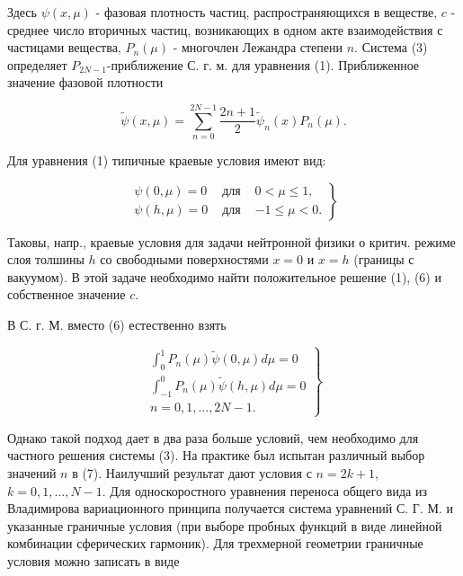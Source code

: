 \documentclass[10pt]{article}
\begin{document}
Здесь $\psi(x, \mu)$ - фазовая плотность частиц, распространяющихся в веществе, $c$ - среднее число вторичных частиц, возникающих в одном акте взаимодействия с частицами вещества, $P_{n}(\mu)$ - многочлен Лежандра степени $n$. Система (3) определяет $P_{2 N-1}$-приближение С. г. м. для уравнения (1). Приближенное значение фазовой плотности



\[

\tilde{\psi}(x, \mu)=\sum_{n=0}^{2 N-1} \frac{2 n+1}{2} \tilde{\psi}_{n}(x) P_{n}(\mu) .

\]



Для уравнения (1) типичные краевые условия имеют вид:



\[

\left.\begin{array}{lll}

\psi(0, \mu)=0 & \text { для } & 0<\mu \leqslant 1, \\

\psi(h, \mu)=0 & \text { для } & -1 \leqslant \mu<0 .

\end{array}\right\}

\]



Таковы, напр., краевые условия для задачи нейтронной физики о критич. режиме слоя толшины $h$ со свободными поверхностями $x=0$ и $x=h$ (границы с вакуумом). В этой задаче необходимо найти положительное решение (1), (6) и собственное значение $c$.



В С. г. М. вместо (6) естественно взять



\[

\left.\begin{array}{c}

\int_{0}^{1} P_{n}(\mu) \tilde{\psi}(0, \mu) d \mu=0 \\

\int_{-1}^{0} P_{n}(\mu) \tilde{\psi}(h, \mu) d \mu=0 \\

n=0,1, \ldots, 2 N-1 .

\end{array}\right\}

\]



Однако такой подход дает в два раза больше условий, чем необходимо для частного решения системы (3). На практике был испытан различный выбор значений $n$ в (7). Наилучший результат дают условия с $n=2 k+1$, $k=0,1, \ldots, N-1$. Для односкоростного уравнения переноса общего вида из Владимирова вариационного принципа получается система уравнений С. Г. М. и указанные граничные условия (при выборе пробных функций в виде линейной комбинации сферических гармоник). Для трехмерной геометрии граничные условия можно записать в виде
\end{document}

